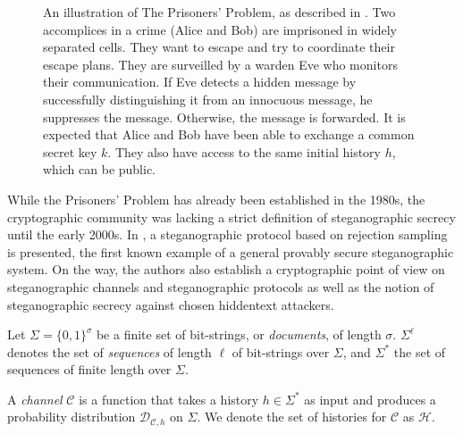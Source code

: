 \begin{figure}[htbp]
\centering
{}
\caption{
An illustration of The Prisoners' Problem, as described in \cite{Simmons1983}.
Two accomplices in a crime (Alice and Bob) are imprisoned in widely separated cells.
They want to escape and try to coordinate their escape plans.
They are surveilled by a warden Eve who monitors their communication.
If Eve detects a hidden message by successfully distinguishing it from an innocuous message, he suppresses the message.
Otherwise, the message is forwarded.
It is expected that Alice and Bob have been able to exchange a common secret key $k$.
They also have access to the same initial history $h$, which can be public.
}
\label{fig:prisonersgame}
\end{figure}

While the Prisoners' Problem has already been established in the 1980s, the cryptographic community was lacking a strict definition of steganographic secrecy until the early 2000s.
In \cite{HLA2002}, a steganographic protocol based on rejection sampling is presented, the first known example of a general provably secure steganographic system.
On the way, the authors also establish a cryptographic point of view on steganographic channels and steganographic protocols as well as the notion of steganographic secrecy against chosen hiddentext attackers.

\begin{definition}
Let $\Sigma = \{0,1\}^\sigma$ be a finite set of bit-strings, or \emph{documents}, of length $\sigma$.
$\Sigma^\ell$ denotes the set of \emph{sequences} of length $\ell$ of bit-strings over $\Sigma$, and $\Sigma^*$ the set of sequences of finite length over $\Sigma$.

A \emph{channel} $\mathcal{C}$ is a function that takes a history $h \in \Sigma^*$ as input and produces a probability distribution $\mathcal{D}_{\mathcal{C},h}$ on $\Sigma$.
We denote the set of histories for $\mathcal{C}$ as $\mathcal{H}$.
\end{definition}

